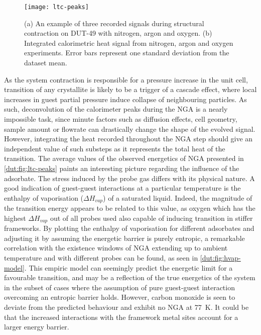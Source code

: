 \begin{figure}[htb]
    \centering
    \texttt{[image: ltc-peaks]}%
    \caption{(a) An example of three recorded signals during 
    structural contraction on DUT-49 with nitrogen, argon and 
    oxygen. (b) Integrated calorimetric heat signal from 
    nitrogen, argon and oxygen experiments. Error bars 
    represent one standard deviation from the dataset mean.}%
    \label{dut:fig:ltc-peaks}
\end{figure}

As the system contraction is responsible for a pressure increase
in the unit cell, transition of any crystallite is likely to be a
trigger of a cascade effect, where local increases in guest partial 
pressure induce collapse of neighbouring particles. As such,
deconvolution of the calorimeter peaks during the \gls{NGA} is a nearly 
impossible task, since minute factors such as diffusion effects,
cell geometry, sample amount or flowrate can drastically change 
the shape of the evolved signal. However, integrating the heat 
recorded throughout the \gls{NGA} step should give an independent value of such
substeps as it represents the total heat of the transition. 
The average values of the observed energetics of 
\gls{NGA} presented in \autoref{dut:fig:ltc-peaks} paints an interesting
picture regarding the influence of the adsorbate.
The stress induced by the probe gas differs with its physical
nature. A good indication of guest-guest interactions at 
a particular temperature is the enthalpy of vaporisation 
(\(\Delta H_{vap}\)) of a saturated liquid. Indeed, the magnitude
of the transition energy appears to be related to this value, as
oxygen which has the highest \(\Delta H_{vap}\) out of all probes 
used also capable of inducing transition in stiffer frameworks. By
plotting the enthalpy of vaporisation for different adsorbates
and adjusting it by assuming the energetic barrier is purely 
entropic, a remarkable correlation with the existence windows
of \gls{NGA} extending up to ambient temperature and with different probes
can be found, as seen in \autoref{dut:fig:hvap-model}.
This empiric model can seemingly predict the energetic limit
for a favourable transition, and may be a reflection of the 
true energetics of the system in the subset of cases where the 
assumption of pure guest-guest interaction overcoming an entropic
barrier holds. However, carbon monoxide is seen to deviate from
the predicted behaviour and exhibit no \gls{NGA} at \SI{77}{\kelvin}. 
It could be that the increased interactions with the framework metal
sites account for a larger energy barrier.

